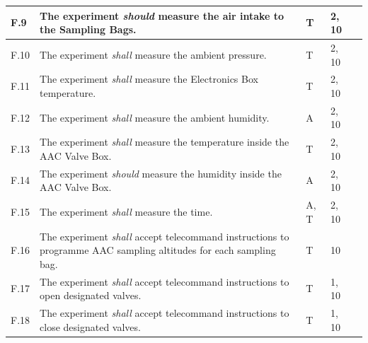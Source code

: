 \documentclass[a4paper,12pt,twoside]{article}
\begin{document}
\begin{longtable}[]{|m{}| m{} |m{} |m{}|m{}|}
F.9  & The experiment \textit{should} measure the air intake to the Sampling Bags.                                                                                                      &       T       & 2, 10            &        \\ \hline
F.10 & The experiment \textit{shall} measure the ambient pressure.                                                                                                                      &       T       & 2, 10            &        \\ \hline
F.11 & The experiment \textit{shall} measure the Electronics Box temperature.                                                                                                                   &       T       & 2, 10            &        \\ \hline
F.12 & The experiment \textit{shall} measure the ambient humidity.                                                                                                                      &      A        & 2, 10            &        \\ \hline
F.13 & The experiment \textit{shall} measure the temperature inside the AAC Valve Box.                                                                                                  &      T        & 2, 10            &        \\ \hline
F.14 & The experiment \textit{should} measure the humidity inside the AAC Valve Box.                                                                                                    &      A        & 2, 10            &        \\ \hline
F.15 & The experiment \textit{shall} measure the time.                                                                                                                                  &        A, T      & 2, 10            &        \\ \hline
F.16 & The experiment \textit{shall} accept telecommand instructions to programme AAC sampling altitudes for each sampling bag.                                                         &      T        & 10            &        \\ \hline
F.17 & The experiment \textit{shall} accept telecommand instructions to open designated valves.                                                                                         &      T        & 1, 10            &        \\ \hline
F.18 & The experiment \textit{shall} accept telecommand instructions to close designated valves.                                                                                        &      T        & 1, 10            &        \\ \hline

\end{longtable}
\end{document}
